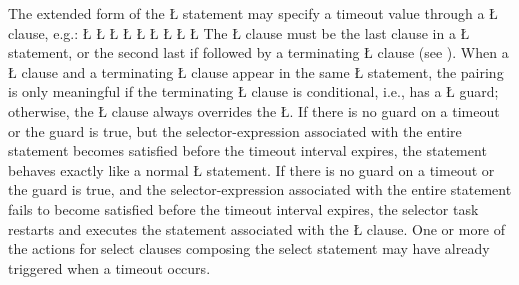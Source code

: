\documentclass[openright,twoside]{report}
\begin{document}
The extended form of the \LGinlinetrue\LGbegin\lgrinde\L{}\endlgrinde\LGend{} statement may specify a timeout value through a \LGinlinetrue\LGbegin\lgrinde\L{}\endlgrinde\LGend{} clause, e.g.:
\LGinlinefalse\LGbegin\lgrinde
\L{}
\CE{}\L{\LB{}}
\L{\LB{}}
\CE{}\L{}
\L{\LB{}}
\L{\LB{}}
\L{}
\CE{}\L{\LB{}}
\CE{}\L{\LB{}}
\CE{}\endlgrinde\LGend
{}%
%
%
The \LGinlinetrue\LGbegin\lgrinde\L{}\endlgrinde\LGend{} clause must be the last clause in a \LGinlinetrue\LGbegin\lgrinde\L{}\endlgrinde\LGend{} statement, or the second last if followed by a terminating \LGinlinetrue\LGbegin\lgrinde\L{}\endlgrinde\LGend{} clause (see ).
When a \LGinlinetrue\LGbegin\lgrinde\L{}\endlgrinde\LGend{} clause and a terminating \LGinlinetrue\LGbegin\lgrinde\L{}\endlgrinde\LGend{} clause appear in the same \LGinlinetrue\LGbegin\lgrinde\L{}\endlgrinde\LGend{} statement, the pairing is only meaningful if the terminating \LGinlinetrue\LGbegin\lgrinde\L{}\endlgrinde\LGend{} clause is conditional, i.e., has a \LGinlinetrue\LGbegin\lgrinde\L{}\endlgrinde\LGend{} guard;
otherwise, the \LGinlinetrue\LGbegin\lgrinde\L{}\endlgrinde\LGend{} clause always overrides the \LGinlinetrue\LGbegin\lgrinde\L{}\endlgrinde\LGend{}.
If there is no guard on a timeout or the guard is true, but the selector-expression associated with the entire statement becomes satisfied before the timeout interval expires, the statement behaves exactly like a normal \LGinlinetrue\LGbegin\lgrinde\L{}\endlgrinde\LGend{} statement.
If there is no guard on a timeout or the guard is true, and the selector-expression associated with the entire statement fails to become satisfied before the timeout interval expires, the selector task restarts and executes the statement associated with the \LGinlinetrue\LGbegin\lgrinde\L{}\endlgrinde\LGend{} clause.
One or more of the actions for select clauses composing the select statement may have already triggered when a timeout occurs.
\end{document}
